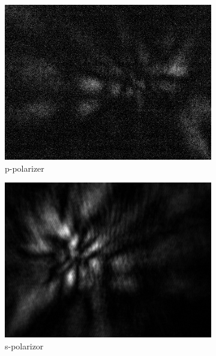 \begin{figure}[!h]
\centering
  \begin{subfigure}[b]{0.2\textwidth}
    \includegraphics[width=\textwidth]{diffraction_image/2015040117594700171-1}
    \caption{p-polarizer}
  \end{subfigure}
  \begin{subfigure}[b]{0.2\textwidth}
    \includegraphics[width=\textwidth]{diffraction_image/2015040117594700171-2}
    \caption{s-polarizor}
  \end{subfigure}
  \begin{subfigure}[b]{0.2\textwidth}

\end{subfigure}
\end{figure}
